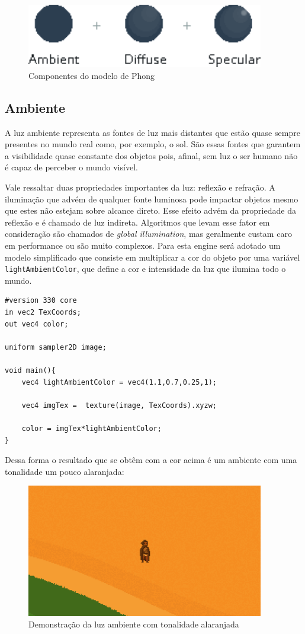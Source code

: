 \documentclass[12pt, 
openright, 
oneside, 
a4paper,    
brazil]{facom-ufu-abntex2}
\begin{document}
\begin{figure}[H]
	\centering
	\includegraphics[width=28em]{imagens/lightning.png}
	\caption{Componentes do modelo de Phong}
\end{figure}




\subsection{Ambiente}
A luz ambiente representa as fontes de luz mais distantes que estão quase sempre presentes no mundo real como, por exemplo, o sol. São essas fontes que garantem a visibilidade quase constante dos objetos pois, afinal, sem luz o ser humano não é capaz de perceber o mundo visível.

Vale ressaltar duas propriedades importantes da luz: reflexão e refração. A iluminação que advém de qualquer fonte luminosa pode impactar objetos mesmo que estes não estejam sobre alcance direto. Esse efeito advém da propriedade da reflexão e é chamado de luz indireta. Algoritmos que levam esse fator em consideração são chamados de \textit{global illumination}, mas geralmente custam caro em performance ou são muito complexos.
Para esta engine será adotado um modelo simplificado que consiste em multiplicar a cor do objeto por uma variável \texttt{lightAmbientColor}, que define a cor e intensidade da luz que ilumina todo o mundo.

\begin{lstlisting}[caption=Fragment Shader com luz ambiente]
#version 330 core
in vec2 TexCoords;
out vec4 color;

uniform sampler2D image;

void main(){
	vec4 lightAmbientColor = vec4(1.1,0.7,0.25,1);
	
	vec4 imgTex =  texture(image, TexCoords).xyzw;
	
	color = imgTex*lightAmbientColor;
}
\end{lstlisting}

Dessa forma o resultado que se obtêm com a cor acima é um ambiente com uma tonalidade um pouco alaranjada:

\begin{figure}[H]
	\centering
	\includegraphics[width=28em]{imagens/sunset.png}
	\caption{Demonstração da luz ambiente com tonalidade alaranjada}
\end{figure}
\end{document}
